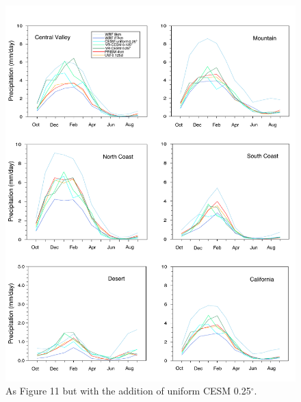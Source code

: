 \begin{figure}
\begin{center}
\includegraphics[width=6in]{supplement/trd_pr_allzones_with_uniform_CESM.pdf}
\caption{As Figure 11 but with the addition of uniform CESM 0.25$^\circ$.}
\end{center}
\end{figure}

